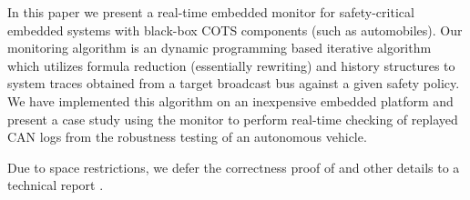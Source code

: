 In this paper we present a real-time embedded monitor for safety-critical embedded systems with black-box COTS components (such as automobiles). Our monitoring algorithm \monitor is an dynamic programming based iterative algorithm which utilizes formula reduction (essentially rewriting) and history structures to system traces obtained from a target broadcast bus against a given safety policy. We have implemented this algorithm on an inexpensive embedded platform and present a case study using the monitor to perform real-time checking of replayed CAN logs from the robustness testing of an autonomous vehicle.

Due to space restrictions, we defer the correctness proof of \monitor and other details to a technical report \cite{TechReport}.

